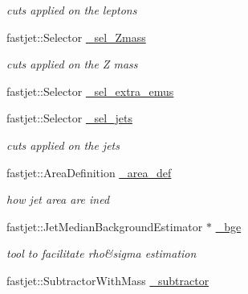\begin{CompactItemize}
\begin{CompactList}\small\item\em cuts applied on the leptons \item\end{CompactList}\item 
\hypertarget{classHZAnalysis_559360dcdc894819dc37b7e4ad01315c}{
fastjet::Selector \hyperlink{classHZAnalysis_559360dcdc894819dc37b7e4ad01315c}{\_\-sel\_\-Zmass}}
\label{classHZAnalysis_559360dcdc894819dc37b7e4ad01315c}

\begin{CompactList}\small\item\em cuts applied on the Z mass \item\end{CompactList}\item 
fastjet::Selector \hyperlink{classHZAnalysis_4ba1f2f659e07bda194f7eb8c6a2377c}{\_\-sel\_\-extra\_\-emus}
\item 
\hypertarget{classHZAnalysis_6f914560f0c0ebc04d5e5e7ed0312e00}{
fastjet::Selector \hyperlink{classHZAnalysis_6f914560f0c0ebc04d5e5e7ed0312e00}{\_\-sel\_\-jets}}
\label{classHZAnalysis_6f914560f0c0ebc04d5e5e7ed0312e00}

\begin{CompactList}\small\item\em cuts applied on the jets \item\end{CompactList}\item 
\hypertarget{classHZAnalysis_0eb24e81f3d7cafaaddeccad77b85629}{
fastjet::Area\-Definition \hyperlink{classHZAnalysis_0eb24e81f3d7cafaaddeccad77b85629}{\_\-area\_\-def}}
\label{classHZAnalysis_0eb24e81f3d7cafaaddeccad77b85629}

\begin{CompactList}\small\item\em how jet area are ined \item\end{CompactList}\item 
\hypertarget{classHZAnalysis_86a3493a6f5ca9f2a9448c34342a8a71}{
fastjet::Jet\-Median\-Background\-Estimator $\ast$ \hyperlink{classHZAnalysis_86a3493a6f5ca9f2a9448c34342a8a71}{\_\-bge}}
\label{classHZAnalysis_86a3493a6f5ca9f2a9448c34342a8a71}

\begin{CompactList}\small\item\em tool to facilitate rho\&sigma estimation \item\end{CompactList}\item 
\hypertarget{classHZAnalysis_e2176a845002e99ad6da4489efceff1f}{
fastjet::Subtractor\-With\-Mass \hyperlink{classHZAnalysis_e2176a845002e99ad6da4489efceff1f}{\_\-subtractor}}
\label{classHZAnalysis_e2176a845002e99ad6da4489efceff1f}


\end{CompactItemize}
